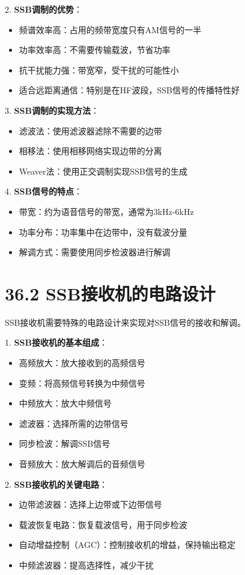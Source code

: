 \documentclass[12pt,UTF8]{ctexbook}
\begin{document}
2. \textbf{SSB调制的优势}：
   \begin{itemize}[leftmargin=3.5em]
   \item 频谱效率高：占用的频带宽度只有AM信号的一半
   \item 功率效率高：不需要传输载波，节省功率
   \item 抗干扰能力强：带宽窄，受干扰的可能性小
   \item 适合远距离通信：特别是在HF波段，SSB信号的传播特性好
   \end{itemize}

3. \textbf{SSB调制的实现方法}：
   \begin{itemize}[leftmargin=3.5em]
   \item 滤波法：使用滤波器滤除不需要的边带
   \item 相移法：使用相移网络实现边带的分离
   \item Weaver法：使用正交调制实现SSB信号的生成
   \end{itemize}

4. \textbf{SSB信号的特点}：
   \begin{itemize}[leftmargin=3.5em]
   \item 带宽：约为语音信号的带宽，通常为3kHz-6kHz
   \item 功率分布：功率集中在边带中，没有载波分量
   \item 解调方式：需要使用同步检波器进行解调
   \end{itemize}

\section*{36.2 SSB接收机的电路设计}

SSB接收机需要特殊的电路设计来实现对SSB信号的接收和解调。

1. \textbf{SSB接收机的基本组成}：
   \begin{itemize}[leftmargin=3.5em]
   \item 高频放大：放大接收到的高频信号
   \item 变频：将高频信号转换为中频信号
   \item 中频放大：放大中频信号
   \item 滤波器：选择所需的边带信号
   \item 同步检波：解调SSB信号
   \item 音频放大：放大解调后的音频信号
   \end{itemize}

2. \textbf{SSB接收机的关键电路}：
   \begin{itemize}[leftmargin=3.5em]
   \item 边带滤波器：选择上边带或下边带信号
   \item 载波恢复电路：恢复载波信号，用于同步检波
   \item 自动增益控制（AGC）：控制接收机的增益，保持输出稳定
   \item 中频滤波器：提高选择性，减少干扰
   \end{itemize}
\end{document}
